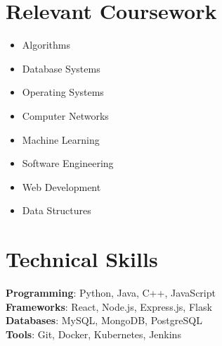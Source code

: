 \documentclass[letterpaper,11pt]{article}
\newcommand{\resumeSubHeadingListStart}{\begin{itemize}[leftmargin=0.0in, label={}]}
\newcommand{\resumeSubHeadingListEnd}{\end{itemize}}
\begin{document}
\section{Relevant Coursework}
        \begin{multicols}{4}
            \begin{itemize}[itemsep=-5pt, parsep=3pt]
                \item\small Algorithms
                \item\small Database Systems
                \item\small Operating Systems
                \item\small Computer Networks
                \item\small Machine Learning
                \item\small Software Engineering
                \item\small Web Development
                \item\small Data Structures
            \end{itemize}
        \end{multicols}
        \vspace*{2.0\multicolsep}

\vspace{3pt}
\section{Technical Skills}
 \begin{itemize}[leftmargin=0.15in, label={}]
    \small{
      \item{
        \textbf{ Programming}{: Python, Java, C++, JavaScript} \\
        \textbf{ Frameworks}{: React, Node.js, Express.js, Flask} \\
        \textbf{ Databases}{: MySQL, MongoDB, PostgreSQL} \\
        \textbf{ Tools}{: Git, Docker, Kubernetes, Jenkins} \\
    }}
 \end{itemize}
 \vspace{-16pt}

\end{document}
